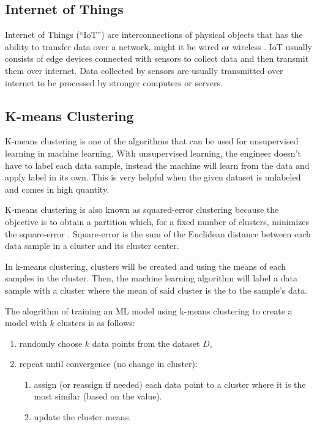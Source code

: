 \subsection{Internet of Things}

Internet of Things (``IoT'') are interconnections of physical objects that has
the ability to transfer data over a network, might it be wired or wireless
\cite{iot}. IoT usually consists of edge devices connected with sensors to collect
data and then transmit them over internet. Data collected by sensors are usually
transmitted over internet to be processed by stronger computers or servers.

\subsection{K-means Clustering}

K-means clustering is one of the algorithms that can be used for
unsupervised learning in machine learning. With unsupervised learning,
the engineer doesn't have to label each data sample, instead the machine will
learn from the data and apply label in its own. This is very helpful when
the given dataset is unlabeled and comes in high quantity.

K-means clustering is also known as squared-error clustering because the
objective is to obtain a partition which, for a fixed number of clusters,
minimizes the square-error \cite*{clustering_fariska}. Square-error is the sum
of the Euclidean distance between each data sample in a cluster and its cluster
center.

In k-means clustering, clusters will be created and using the means of each
samples in the cluster. Then, the machine learning algorithm will label a data
sample with a cluster where the mean of said cluster is the to the sample's
data.

The alogrithm of training an ML model using k-means clustering to create a model
with $k$ clusters is as follows\cite{clustering_fariska}:
\begin{enumerate}
	\item randomly choose $k$ data points from the dataset $D$,
	\item repeat until convergence (no change in cluster):
	      \begin{enumerate}
		      \item assign (or reassign if needed) each data point to a cluster
		            where it is the most similar (based on the value).
		      \item update the cluster means.
	      \end{enumerate}
\end{enumerate}

